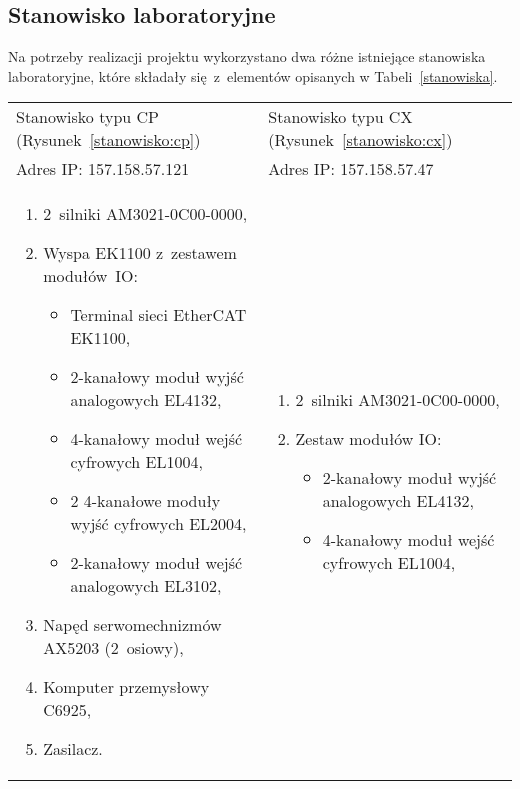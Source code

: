 \subsection{Stanowisko laboratoryjne}
Na potrzeby realizacji projektu wykorzystano dwa różne istniejące stanowiska laboratoryjne, które składały się~z~elementów opisanych w Tabeli~\ref{stanowiska}.
\begin{table}[!htb]
\begin{center}
\begin{tabular}{| p{} | p{} |}\hline
Stanowisko typu CP (Rysunek~\ref{stanowisko:cp}) & Stanowisko typu CX (Rysunek~\ref{stanowisko:cx})  \\
Adres IP: 157.158.57.121 & Adres IP: 157.158.57.47  \\\hline
\begin{enumerate}[leftmargin=7mm]
\setlength{\itemsep}{5pt}
\setlength{\parskip}{0pt}
\setlength{\parsep}{0pt}
\item 2~silniki AM3021-0C00-0000,
\item Wyspa EK1100 z~zestawem modułów~IO:
\begin{itemize}[leftmargin=3mm]
\setlength{\itemsep}{3pt}
\setlength{\parskip}{0pt}
\setlength{\parsep}{0pt}
\item Terminal sieci EtherCAT EK1100,
\item 2-kanałowy moduł wyjść analogowych EL4132,
\item 4-kanałowy moduł wejść cyfrowych EL1004,
\item 2 4-kanałowe moduły wyjść cyfrowych EL2004,
\item 2-kanałowy moduł wejść analogowych EL3102,
\end{itemize}
\item Napęd serwomechnizmów AX5203 (2~osiowy),
\item Komputer przemysłowy C6925,
\item Zasilacz.
\end{enumerate}
&
\begin{enumerate}[leftmargin=7mm]
\setlength{\itemsep}{5pt}
\setlength{\parskip}{0pt}
\setlength{\parsep}{0pt}
\item 2~silniki AM3021-0C00-0000,
\item Zestaw modułów IO:
\begin{itemize}[leftmargin=3mm]
\setlength{\itemsep}{3pt}
\setlength{\parskip}{0pt}
\setlength{\parsep}{0pt}
\item 2-kanałowy moduł wyjść analogowych EL4132,
\item 4-kanałowy moduł wejść cyfrowych EL1004,

\end{itemize}
\end{enumerate}
\end{tabular}
\end{center}
\end{table}

